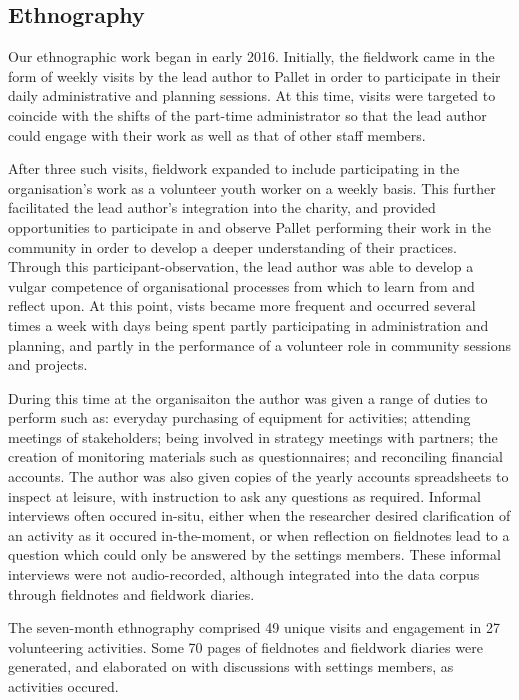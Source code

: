 \subsection{Ethnography}
Our ethnographic work began in early 2016. Initially, the fieldwork came in the form of weekly visits by the lead author to Pallet in order to participate in their daily administrative and planning sessions. At this time, visits were targeted to coincide with the shifts of the part-time administrator so that the lead author could engage with their work as well as that of other staff members.

After three such visits, fieldwork expanded to include participating in the organisation's work as a volunteer youth worker on a weekly basis. This further facilitated the lead author's integration into the charity, and provided opportunities to participate in and observe Pallet performing their work in the community in order to develop a deeper understanding of their practices. Through this participant-observation, the lead author was able to develop a vulgar competence \cite{crabtree_doing_2012} of organisational processes from which to learn from and reflect upon. At this point, vists became more frequent and occurred several times a week with days being spent partly participating in administration and planning, and partly in the performance of a volunteer role in community sessions and projects.

During this time at the organisaiton the author was given a range of duties to perform such as: everyday purchasing of equipment for activities; attending meetings of stakeholders; being involved in strategy meetings with partners; the creation of monitoring materials such as questionnaires; and reconciling financial accounts. The author was also given copies of the yearly accounts spreadsheets to inspect at leisure, with instruction to ask any questions as required. Informal interviews often occured in-situ, either when the researcher desired clarification of an activity as it occured in-the-moment, or when reflection on fieldnotes lead to a question which could only be answered by the settings members. These informal interviews were not audio-recorded, although integrated into the data corpus through fieldnotes and fieldwork diaries.

The seven-month ethnography comprised 49 unique visits and engagement in 27 volunteering activities. Some 70 pages of fieldnotes and fieldwork diaries were generated, and elaborated on with discussions with settings members, as activities occured.


